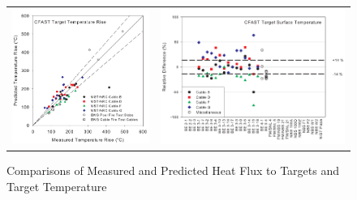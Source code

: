 \begin{figure}[p]
\begin{center}
\begin{tabular}{lr}
\includegraphics[width=2.6in]{FIGURES/ScatterPlots/Target_Temps} & \includegraphics[width=3.5in]{FIGURES/Relative_Diff/Target_Temps}
\end{tabular}
\end{center}
\caption{Comparisons of Measured and Predicted Heat Flux to Targets and Target Temperature} \label{fig:Target_Scatter}
\end{figure}


